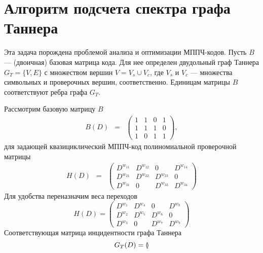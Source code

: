 \chapter{Алгоритм подсчета спектра графа Таннера}

Эта задача порождена проблемой анализа и оптимизации МППЧ-кодов. 
Пусть $B$  --- (двоичная) базовая матрица кода.
Для нее определен двудольный граф Таннера $G_T=\{V, E \}$ с множеством вершин 
$V= V_s \cup V_c$, где  $V_s$ и  $V_c$ --- множества символьных и проверочных вершин, 
соответственно. Единицам  матрицы $B$ соответствуют ребра графа $G_T$. 


\begin{example} \label{ex1}
Рассмотрим  базовую матрицу $B$ 
\begin{eqnarray}%
B(D)&=&
\begin{pmatrix}
1&1&0&   1\\
1&1&1& 0\\
1&0         & 1& 1
\end{pmatrix},       
\end{eqnarray}
для задающей квазициклический МППЧ-код полиномиальной проверочной матрицы 
\begin{eqnarray}%
H(D)&=&
\begin{pmatrix}
D^{w_{11}}&D^{w_{12}}&0&   D^{w_{14}}\\
D^{w_{21}}&D^{w_{22}}& D^{w_{23}}& 0\\
D^{w_{31}}&0         &  D^{w_{33}}& D^{w_{34}}
\end{pmatrix}                          \label{H0}                                                                                                                  
\end{eqnarray}
Для удобства переназначим веса переходов
\begin{equation} \label{H}
H(D)=
\begin{pmatrix}
D^{w_{1}}&D^{w_{4}}&0                   &   D^{w_{8}}\\
D^{w_{2}}&D^{w_{5}}& D^{w_{6}}& 0\\
D^{w_{3}}&0                &  D^{w_{7}}& D^{w_{9}}
\end{pmatrix}                                                                                                                                           
\end{equation}
Соответствующая матрица инцидентности графа Таннера 
\[
\arraycolsep=1.5pt \def\arraystretch{1}
G_T(D)=
\begin{pmatrix}

\end{pmatrix}\]
\end{example}
